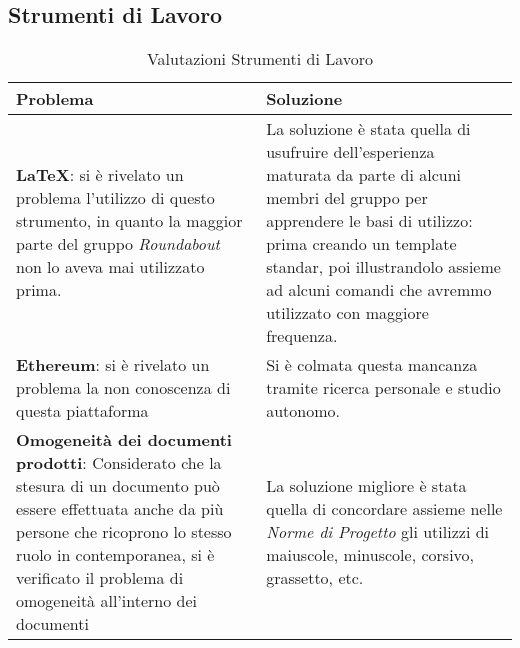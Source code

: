 \subsection{Strumenti di Lavoro}
	\begin{longtable}{ 
			>{\centering}p{} 
			>{\centering\arraybackslash}p{} }
		
		\caption {Valutazioni Strumenti di Lavoro}		\\
		
		\textbf{\color{white}Problema} &
		\textbf{\color{white}Soluzione}
		\tabularnewline  
		\endhead
		
		\textbf{\LaTeX{}}: si è rivelato un problema l'utilizzo di questo strumento, in quanto la maggior parte del gruppo \textit{Roundabout} non lo aveva mai utilizzato prima. & La soluzione è stata quella di usufruire dell'esperienza maturata da parte di alcuni membri del gruppo per apprendere le basi di utilizzo: prima creando un template standar, poi illustrandolo assieme ad alcuni comandi che avremmo utilizzato con maggiore frequenza. \\
		
		\textbf{Ethereum}: si è rivelato un problema la non conoscenza di questa piattaforma & Si è colmata questa mancanza tramite ricerca personale e studio autonomo. \\
		
		\textbf{Omogeneità dei documenti prodotti}: Considerato che la stesura di un documento può essere effettuata anche da più persone che ricoprono lo stesso ruolo in contemporanea, si è verificato il problema di omogeneità all'interno dei documenti & La soluzione migliore è stata quella di concordare assieme nelle \textit{Norme di Progetto} gli utilizzi di maiuscole, minuscole, corsivo, grassetto, etc. \\
		
	\end{longtable}

